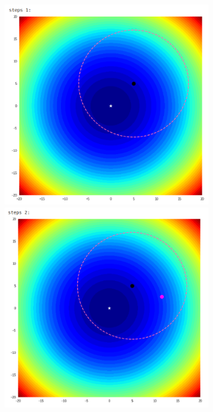 \documentclass{book}
\begin{document}
\begin{itemize}
\begin{figure}[H]
\begin{figure}[H]
\begin{minipage}[c]{0.3\textwidth}
                \centering
                \includegraphics[width=\textwidth]{images/one_plus_one_ex_step_1.png}
            \end{minipage}
            \begin{minipage}[c]{0.3\textwidth}
                \centering
                \includegraphics[width=\textwidth]{images/one_plus_one_ex_step_2.png}

\end{minipage}
\end{figure}
\end{figure}
\end{itemize}
\end{document}
